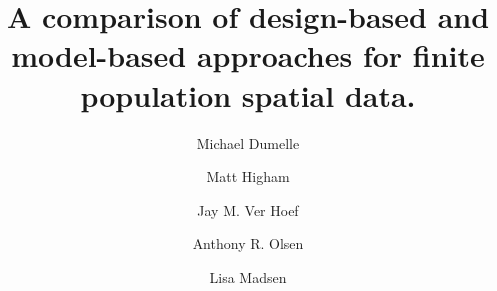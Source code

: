 \documentclass[]{elsarticle} %
\begin{document}
\begin{frontmatter}

  \title{A comparison of design-based and model-based approaches for
finite population spatial data.}
    \author[USEPA]{Michael Dumelle}
  
    \author[STLAW]{Matt Higham}
  
    \author[NOAA]{Jay M. Ver Hoef}
  
    \author[USEPA]{Anthony R. Olsen}
  
    \author[OSU]{Lisa Madsen}
  
      \address[USEPA]{United States Environmental Protection Agency, 200
SW 35th St, Corvallis, Oregon, 97333}
    \address[STLAW]{Saint Lawrence University Department of Mathematics,
Computer Science, and Statistics, 23 Romoda Drive, Canton, New York,
13617}
    \address[NOAA]{Marine Mammal Laboratory, Alaska Fisheries Science
Center, National Oceanic and Atmospheric Administration, Seattle,
Washington, 98115}
    \address[OSU]{Oregon State University Department of Statistics, 239
Weniger Hall, Corvallis, Oregon, 97331}
  

\end{frontmatter}
\end{document}
